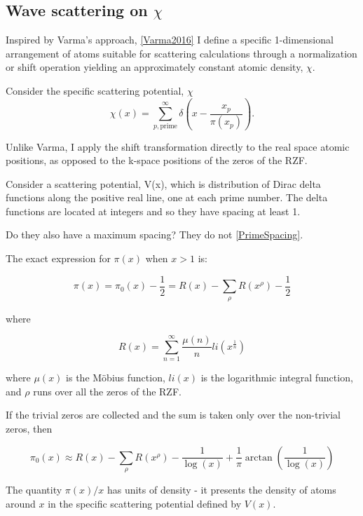 \documentclass[11pt, oneside]{article}   	%
\begin{document}
\subsection{Wave scattering on $\chi$}
Inspired by Varma's approach, \ref{Varma2016} I define a specific 1-dimensional arrangement of atoms suitable for scattering calculations through a normalization or shift operation yielding an approximately constant atomic density, $\chi$.

Consider the specific scattering potential, $\chi$
\begin{equation}
\chi(x) = \sum_{p, \text{prime}}^{\infty} \delta(x - \frac{x_p}{\pi(x_p)}).
\end{equation}


Unlike Varma, I apply the shift transformation directly to the real space atomic positions, as opposed to the k-space positions of the zeros of the RZF.

Consider a scattering potential, V(x), which is distribution of Dirac delta functions along the positive real line, one at each prime number. 
The delta functions are located at integers and so they have spacing at least 1.

Do they also have a maximum spacing? They do not \ref{PrimeSpacing}.

The exact expression \cite{Riemann} for $\pi(x)$ when $x>1$ is:

\begin{equation}
\pi(x) = \pi_0(x) - \frac{1}{2} = R(x) - \sum_{\rho}R(x^{\rho}) - \frac{1}{2}
\end{equation}

where

\begin{equation}
R(x) = \sum_{n=1}^{\infty}\frac{\mu(n)}{n}li(x^{\frac{1}{n}})
\end{equation}

where $\mu(x)$ is the M\"obius function, $li(x)$ is the logarithmic integral function, and $\rho$ runs over all the zeros of the RZF.

If the trivial zeros are collected and the sum is taken only over the non-trivial zeros, then

\begin{equation}
\pi_0(x) \approx R(x) - \sum_{\rho}R(x^{\rho}) - \frac{1}{\log(x)} + \frac{1}{\pi}\arctan(\frac{1}{\log(x)})
\end{equation}
 


The quantity $\pi(x)/x$ has units of density - it presents the density of atoms around $x$ in the specific scattering potential defined by $V(x)$.
\end{document}

